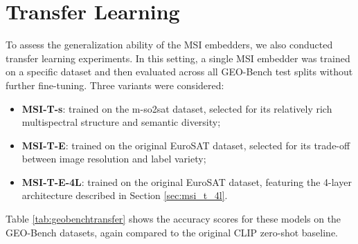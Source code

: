 \documentclass[a4paper, twoside, english]{sapthesis} %
\begin{document}
\section{Transfer Learning}

To assess the generalization ability of the MSI embedders, we also conducted transfer learning experiments. In this setting, a single MSI embedder was trained on a specific dataset and then evaluated across all GEO-Bench test splits without further fine-tuning. Three variants were considered:

\begin{itemize}
    \item \textbf{MSI-T-s}: trained on the m-so2sat dataset, selected for its relatively rich multispectral structure and semantic diversity;
    \item \textbf{MSI-T-E}: trained on the original EuroSAT dataset, selected for its trade-off between image resolution and label variety;
    \item \textbf{MSI-T-E-4L}: trained on the original EuroSAT dataset, featuring the 4-layer architecture described in Section \ref{sec:msi_t_4l}.
\end{itemize}

Table \ref{tab:geobenchtransfer} shows the accuracy scores for these models on the GEO-Bench datasets, again compared to the original CLIP zero-shot baseline.
\end{document}

